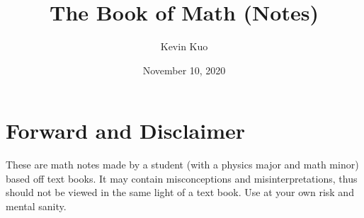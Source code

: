 \documentclass[12pt, english]{book}
\begin{document}
	\title{The Book of Math (Notes)}
	\author{Kevin Kuo}
	\date{November 10, 2020}
	
	\pagestyle{fancy}
	\fancyhead{} %
	\fancyhead[LO]{  }
	\fancyhead[CO]{  }
	\fancyhead[RO]{  }
	\renewcommand{\headrulewidth}{0pt}
	
	\fancyfoot{} %
	\fancyfoot[LO]{}
	\fancyfoot[CO]{\thepage}
	\fancyfoot[RO]{}
	\renewcommand{\footrulewidth}{0pt}
	\vspace{0cm}	
	
	\frontmatter
	
	\maketitle
	
	\newpage
	\section*{Forward and Disclaimer}
	These are math notes made by a student (with a physics major and math minor) based off text books. It may contain misconceptions and misinterpretations, thus should not be viewed in the same light of a text book. Use at your own risk and mental sanity.
	
\end{document}
